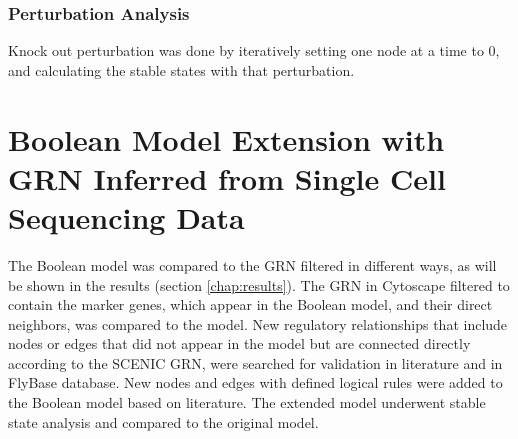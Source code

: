 \subsubsection{Perturbation Analysis}
Knock out perturbation was done by iteratively setting one node at a time to 0, and calculating the stable states with 
that perturbation. 

\section{Boolean Model Extension with GRN Inferred from Single Cell Sequencing Data}
The Boolean model was compared to the GRN filtered in different ways, as will be shown in the results 
(section \ref{chap:results}). 
The GRN in Cytoscape filtered to contain the marker genes, which appear in the Boolean model, and their direct neighbors, 
was compared to the model. New regulatory relationships that include nodes or edges that did not appear in the model 
but are connected directly according to the SCENIC GRN, were searched for validation in literature and in FlyBase database. 
New nodes and edges with defined logical rules were added to the Boolean model based on literature.
The extended model underwent stable state analysis and compared to the original model. 
 



